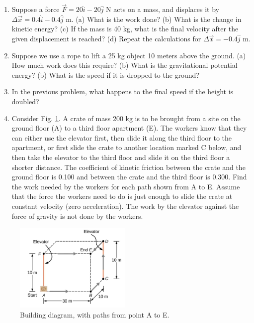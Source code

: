 \documentclass{article}
\begin{document}
\begin{enumerate}
\item Suppose a force $\vec{F} = 20\hat{i} - 20\hat{j}$ N acts on a mass, and displaces it by $\Delta \vec{x} = 0.4\hat{i} - 0.4\hat{j}$ m.  (a) What is the work done?  (b) What is the change in kinetic energy? (c) If the mass is 40 kg, what is the final velocity after the given displacement is reached? (d) Repeat the calculations for $\Delta \vec{x} = -0.4\hat{j}$ m. \\ \vspace{4.5cm}
\item Suppose we use a rope to lift a 25 kg object 10 meters above the ground.  (a) How much work does this require? (b) What is the gravitational potential energy? (b) What is the speed if it is dropped to the ground? \\ \vspace{3cm}
\item In the previous problem, what happens to the final speed if the height is doubled? \\ \vspace{1cm}
\item Consider Fig. \ref{fig:1}. A crate of mass 200 kg is to be brought from a site on the ground floor (A) to a third floor apartment (E). The workers know that they can either use the elevator first, then slide it along the third floor to the apartment, or first slide the crate to another location marked C below, and then take the elevator to the third floor and slide it on the third floor a shorter distance. The coefficient of kinetic friction between the crate and the ground floor is 0.100 and between the crate and the third floor is 0.300.  Find the work needed by the workers for each path shown from A to E. Assume that the force the workers need to do is just enough to slide the crate at constant velocity (zero acceleration).  The work by the elevator against the force of gravity is not done by the workers. 
\end{enumerate}

\begin{figure}
\centering
\includegraphics[width=0.5\textwidth]{figures/elevator.png}
\caption{\label{fig:1} Building diagram, with paths from point A to E.}
\end{figure}
\end{document}
